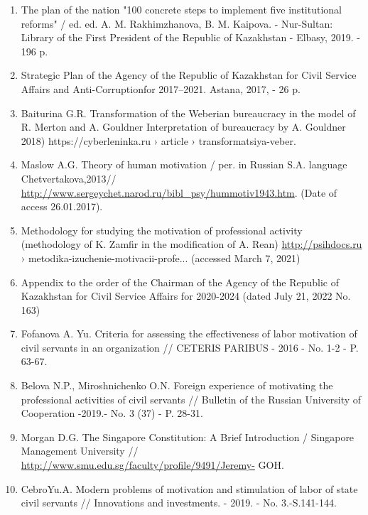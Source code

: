\begin{enumerate}
\item
The plan of the nation "100 concrete steps to implement five
institutional reforms" / ed. ed. A. M. Rakhimzhanova, B. M. Kaipova. -
Nur-Sultan: Library of the First President of the Republic of Kazakhstan
- Elbasy, 2019. - 196 p.

\item
Strategic Plan of the Agency of the Republic of Kazakhstan for Civil
Service Affairs and Anti-Corruptionfor 2017--2021. Astana, 2017, - 26 p.

\item
Baiturina G.R. Transformation of the Weberian bureaucracy in the
model of R. Merton and A. Gouldner Interpretation of bureaucracy by A.
Gouldner 2018) https://cyberleninka.ru › article ›
transformatsiya-veber.

\item
Maslow A.G. Theory of human motivation / per. in Russian S.A.
language Chetvertakova,2013//
\url{http://www.sergeychet.narod.ru/bibl\_psy/hummotiv1943.htm}. (Date of
access 26.01.2017).

\item
Methodology for studying the motivation of professional activity
(methodology of K. Zamfir in the modification of A.
Rean) \url{http://psihdocs.ru} › metodika-izuchenie-motivacii-profe...
(accessed March 7, 2021)

\item
Appendix to the order of the Chairman of the Agency of the Republic
of Kazakhstan for Civil Service Affairs for 2020-2024 (dated July 21,
2022 No. 163)

\item
Fofanova A. Yu. Criteria for assessing the effectiveness of labor
motivation of civil servants in an organization // CETERIS PARIBUS -
2016 - No. 1-2 - P. 63-67.

\item
Belova N.P., Miroshnichenko O.N. Foreign experience of motivating
the professional activities of civil servants // Bulletin of the Russian
University of Cooperation -2019.- No. 3 (37) - P. 28-31.

\item
Morgan D.G. The Singapore Constitution: A Brief Introduction /
Singapore Management University //
\url{http://www.smu.edu.sg/faculty/profile/9491/Jeremy-}
GOH.

\item
CebroYu.A. Modern problems of motivation and stimulation of labor of
state civil servants // Innovations and investments. - 2019. - No.
3.-S.141-144.
\end{enumerate}

